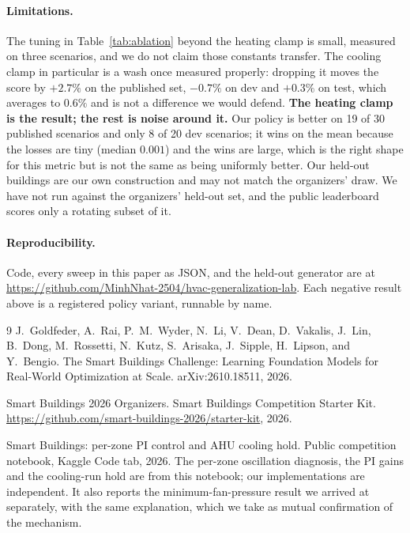 \documentclass[10pt]{article}
\begin{document}
\paragraph{Limitations.} The tuning in Table~\ref{tab:ablation} beyond the
heating clamp is small, measured on three scenarios, and we do not claim those
constants transfer. The cooling clamp in particular is a wash once measured
properly: dropping it moves the score by $+2.7\%$ on the published set,
$-0.7\%$ on dev and $+0.3\%$ on test, which averages to $0.6\%$ and is not a
difference we would defend. \textbf{The heating clamp is the result; the rest
is noise around it.} Our policy is better on 19 of 30 published scenarios and only 8 of
20 dev scenarios; it wins on the mean because the losses are tiny (median
$0.001$) and the wins are large, which is the right shape for this metric but
is not the same as being uniformly better. Our held-out buildings are our own
construction and may not match the organizers' draw. We have not run against
the organizers' held-out set, and the public leaderboard scores only a
rotating subset of it.

\paragraph{Reproducibility.} Code, every sweep in this paper as JSON, and the
held-out generator are at
\url{https://github.com/MinhNhat-2504/hvac-generalization-lab}. Each negative
result above is a registered policy variant, runnable by name.



\begin{thebibliography}{9}
J.~Goldfeder, A.~Rai, P.~M.~Wyder, N.~Li, V.~Dean, D.~Vakalis, J.~Lin, B.~Dong,
M.~Rossetti, N.~Kutz, S.~Arisaka, J.~Sipple, H.~Lipson, and Y.~Bengio.
\newblock The Smart Buildings Challenge: Learning Foundation Models for
Real-World Optimization at Scale.
\newblock arXiv:2610.18511, 2026.

Smart Buildings 2026 Organizers.
\newblock Smart Buildings Competition Starter Kit.
\newblock \url{https://github.com/smart-buildings-2026/starter-kit}, 2026.

Smart Buildings: per-zone PI control and AHU cooling hold.
\newblock Public competition notebook, Kaggle Code tab, 2026.
\newblock The per-zone oscillation diagnosis, the PI gains and the cooling-run
hold are from this notebook; our implementations are independent. It also
reports the minimum-fan-pressure result we arrived at separately, with the
same explanation, which we take as mutual confirmation of the mechanism.
\end{thebibliography}
\end{document}
